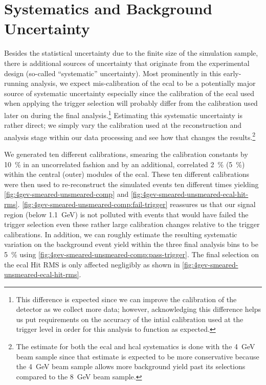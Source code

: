 \section{Systematics and Background Uncertainty}
Besides the statistical uncertainty due to the finite size of the simulation sample,
there is additional sources of uncertainty that originate from the experimental design
(so-called ``systematic'' uncertainty).
Most prominently in this early-running analysis, we expect mis-calibration of the \ac{ecal}
to be a potentially major source of systematic uncertainty especially since the calibration
of the \ac{ecal} used when applying the trigger selection will probably differ from the
calibration used later on during the final analysis.\footnote{
  This difference is expected since we can improve the calibration of the detector as we
  collect more data; however, acknowledging this difference helps us put requirements on
  the accuracy of the intial calibration used at the trigger level in order for this
  analysis to function as expected.
}
Estimating this systematic uncertainty is rather direct; we simply vary the calibration
used at the reconstruction and analysis stage within our data processing and see how that
changes the results.\footnote{
  The estimate for both the \ac{ecal} and \ac{hcal} systematics is done with the
  \qty{4}{\GeV} beam sample since that estimate is expected to be more conservative
  because the \qty{4}{\GeV} beam sample allows more background yield past its selections
  compared to the \qty{8}{\GeV} beam sample.
}

We generated ten different calibrations, smearing the calibration constants by \qty{10}{\percent}
in an uncorrelated fashion and by an additional, correlated \qty{2}{\percent} (\qty{5}{\percent})
within the central (outer) modules of the \ac{ecal}.
These ten different calibrations were then used to re-reconstruct the simulated events
ten different times yielding \cref{fig:4gev-smeared-unsmeared-comp}
and \cref{fig:4gev-smeared-unsmeared-ecal-hit-rms}.
\cref{fig:4gev-smeared-unsmeared-comp:fail-trigger} reassures us that our signal region
(below \qty{1.1}{\GeV}) is not polluted with events that would have failed the trigger
selection even these rather large calibration changes relative to the trigger calibrations.
In addition, we can roughly estimate the resulting systematic variation on the background
event yield within the three final analysis bins to be \qty{5}{\percent} using
\cref{fig:4gev-smeared-unsmeared-comp:pass-trigger}.
The final selection on the \ac{ecal} Hit RMS is only affected negligibly as shown in
\cref{fig:4gev-smeared-unsmeared-ecal-hit-rms}.

